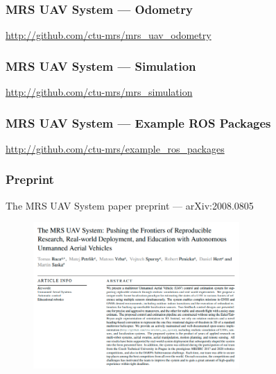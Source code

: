 \documentclass[aspectratio=1610]{beamer}
\begin{document}


  \begin{frame}
    \frametitle{MRS UAV System --- Odometry}


    \begin{block}{\cite{baca2020mrs}}
      \url{http://github.com/ctu-mrs/mrs_uav_odometry}
    \end{block}

  \end{frame}



  \begin{frame}
    \frametitle{MRS UAV System --- Simulation}

    \begin{block}{\cite{baca2020mrs}}
      \url{http://github.com/ctu-mrs/mrs_simulation}
    \end{block}

  \end{frame}



  \begin{frame}
    \frametitle{MRS UAV System --- Example ROS Packages}

    \begin{block}{\cite{baca2020mrs}}
      \url{http://github.com/ctu-mrs/example_ros_packages}
    \end{block}

  \end{frame}


  \begin{frame}
    \frametitle{Preprint}

    \begin{block}{The MRS UAV System paper preprint --- arXiv:2008.0805}
      \begin{figure}
        \includegraphics[width=0.7\textwidth]{./fig/mrs_uav_system_paper.png}
      \end{figure}
    \end{block}

  \end{frame}
\end{document}
